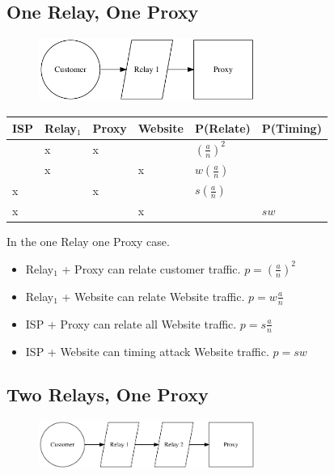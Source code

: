 \documentclass{article}
\begin{document}
\subsection{One Relay, One Proxy}

\begin{figure}[htbp]
  \centering
  \includegraphics[width = 200pt]{stc}
  \caption{}
\end{figure}

\begin{center}
\begin{tabular}{l | l | l | l | l | l}
  ISP & Relay$_1$ & Proxy & Website & P(Relate)          & P(Timing) \\
  \hline
      & x         & x     &         & $(\frac{a}{n})^2$  & \\
  \hline
      & x         &       & x       & $w(\frac{a}{n})$   & \\
  \hline
  x   &           & x     &         & $s(\frac{a}{n})$   & \\
  \hline
  x   &           &       & x       &                    & $sw$ \\
\end{tabular}
\end{center}

In the one Relay one Proxy case.


\begin{itemize}
\item Relay$_1$ + Proxy can relate customer traffic. $p = (\frac{a}{n})^2$
\item Relay$_1$ + Website can relate Website traffic. $p = w\frac{a}{n}$
\item ISP + Proxy can relate all Website traffic. $p = s\frac{a}{n}$
\item ISP + Website can timing attack Website traffic. $p = sw$
\end{itemize}

\subsection{Two Relays, One Proxy}

\begin{figure}[htbp]
  \centering
  \includegraphics[width = 200pt]{sttc}
  \caption{}
\end{figure}
\end{document}

